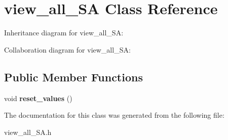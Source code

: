 \hypertarget{classview__all__SA}{}\section{view\+\_\+all\+\_\+\+SA Class Reference}
\label{classview__all__SA}


Inheritance diagram for view\+\_\+all\+\_\+\+SA\+:


Collaboration diagram for view\+\_\+all\+\_\+\+SA\+:
\subsection*{Public Member Functions}
\begin{DoxyCompactItemize}
\item 
void {\bfseries reset\+\_\+values} ()\hypertarget{classview__all__SA_a1407cfb2a8635ffd433ffcf75fb5a494}{}\label{classview__all__SA_a1407cfb2a8635ffd433ffcf75fb5a494}

\end{DoxyCompactItemize}


The documentation for this class was generated from the following file\+:\begin{DoxyCompactItemize}
\item 
view\+\_\+all\+\_\+\+S\+A.\+h\end{DoxyCompactItemize}
